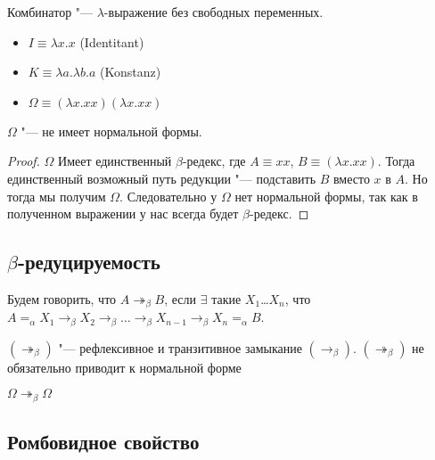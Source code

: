 \begin{definition}
	Комбинатор "--- $\lambda$-выражение без свободных переменных.
\end{definition}

\begin{definition} 
	\hfill
	\begin{itemize}
		\item $I \equiv \lambda{}x.x$ (Identitant)
		\item $K \equiv \lambda{}a.\lambda{}b.a$ (Konstanz)
		\item $\Omega \equiv (\lambda{}x.xx)(\lambda{}x.xx)$
	\end{itemize}
\end{definition}

\begin{lemma}
	$\Omega$ "--- не имеет нормальной формы.
\end{lemma}

\begin{proof}
	$\Omega$ Имеет единственный $\beta$-редекс, где $A \equiv xx$, $B \equiv (\lambda{}x.xx)$. Тогда единственный возможный путь редукции "--- подставить $B$ вместо $x$ в $A$. Но тогда мы получим $\Omega$. Следовательно у $\Omega$ нет нормальной формы, так как в полученном выражении у нас всегда будет $\beta$-редекс.
\end{proof}

\subsection{$\beta$-редуцируемость}

\begin{definition}
	Будем говорить, что $A\twoheadrightarrow_{\beta}B$, если $\exists$ такие $X_{1}$\ldots $X_{n}$, что $A=_{\alpha}X_{1}\to_{\beta}X_{2}\to_{\beta}\ldots\to_{\beta}X_{n-1}\to_{\beta}X_{n}=_{\alpha}B$.
\end{definition}

$(\twoheadrightarrow_{\beta})$ "--- рефлексивное и транзитивное замыкание $(\to_{\beta})$. $(\twoheadrightarrow_{\beta})$ не обязательно приводит к нормальной форме
\begin{example}
	$\Omega\twoheadrightarrow_{\beta}\Omega$
\end{example}

\subsection{Ромбовидное свойство}

